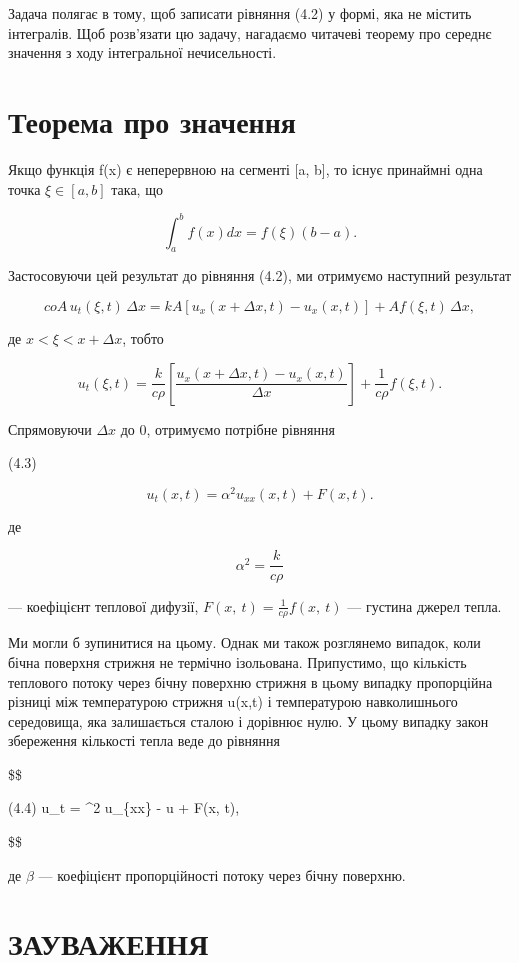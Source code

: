 Задача полягає в тому, щоб записати рівняння (4.2) у формі, яка не містить інтегралів. Щоб розв'язати цю задачу, нагадаємо читачеві теорему про середнє значення з ходу інтегральної нечисельності.

\section{Теорема про значення}\label{ux442ux435ux43eux440ux435ux43cux430-ux43fux440ux43e-ux437ux43dux430ux447ux435ux43dux43dux44f}

Якщо функція f(x) є неперервною на сегменті {[}a, b{]}, то існує принаймні одна точка \(\xi \in [a, b]\) така, що

\[\int_{a}^{b} f(x) dx = f(\xi) (b-a).\]

Застосовуючи цей результат до рівняння (4.2), ми отримуємо наступний результат

\[
coA\,u_t(\xi, t)\,\Delta x = kA\left[u_x(x + \Delta x, t) - u_x(x, t)\right] + Af(\xi, t)\,\Delta x,
\]

де \(x < \xi < x + \Delta x\), тобто

\[
u_t(\xi, t) = \frac{k}{c\rho}\left[\frac{u_x(x + \Delta x, t) - u_x(x, t)}{\Delta x}\right] + \frac{1}{c\rho} f(\xi, t).
\]

Спрямовуючи \(\Delta x\) до 0, отримуємо потрібне рівняння

(4.3)

\[u_t(x, t) = \alpha^2 u_{xx}(x, t) + F(x, t).\]

де

\[\alpha^{2}=\frac{k}{c\rho}\]

--- коефіцієнт теплової дифузії, \(F\left(x,\ t\right)=\frac{1}{c\rho}f\left(x,\ t\right)\) --- густина джерел тепла.

Ми могли б зупинитися на цьому. Однак ми також розглянемо випадок, коли бічна поверхня стрижня не термічно ізольована. Припустимо, що кількість теплового потоку через бічну поверхню стрижня в цьому випадку пропорційна різниці між температурою стрижня u(x,t) і температурою навколишнього середовища, яка залишається сталою і дорівнює нулю. У цьому випадку закон збереження кількості тепла веде до рівняння

\$\$

(4.4) u\_t = \alpha\^{}2 u\_\{xx\} - \beta u + F(x, t),

\$\$

де \(\beta\) --- коефіцієнт пропорційності потоку через бічну поверхню.

\section{ЗАУВАЖЕННЯ}\label{ux437ux430ux443ux432ux430ux436ux435ux43dux43dux44f-3}

